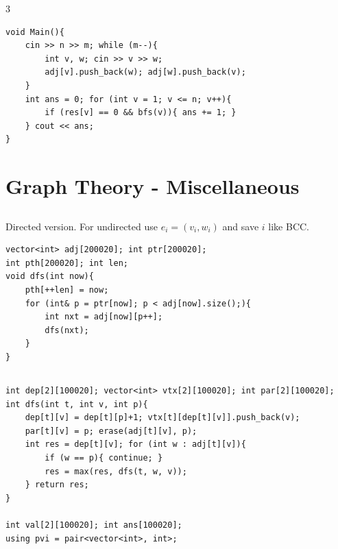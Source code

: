 \documentclass[landscape, 8pt, a4paper, oneside]{extarticle}
\begin{document}
\begin{multicols*}{3}
\begin{verbatim}
void Main(){
	cin >> n >> m; while (m--){
		int v, w; cin >> v >> w;
		adj[v].push_back(w); adj[w].push_back(v);
	}
	int ans = 0; for (int v = 1; v <= n; v++){
		if (res[v] == 0 && bfs(v)){ ans += 1; }
	} cout << ans;
}
\end{verbatim}
\section{Graph Theory - Miscellaneous}
\subsection{}
Directed version. For undirected use $e_i = (v_i, w_i)$ and save $i$ like BCC.
\begin{verbatim}
vector<int> adj[200020]; int ptr[200020];
int pth[200020]; int len;
void dfs(int now){
	pth[++len] = now;
	for (int& p = ptr[now]; p < adj[now].size();){
		int nxt = adj[now][p++];
		dfs(nxt);
	}
}
\end{verbatim}
\subsection{}
\begin{verbatim}
int dep[2][100020]; vector<int> vtx[2][100020]; int par[2][100020];
int dfs(int t, int v, int p){
	dep[t][v] = dep[t][p]+1; vtx[t][dep[t][v]].push_back(v);
	par[t][v] = p; erase(adj[t][v], p);
	int res = dep[t][v]; for (int w : adj[t][v]){
		if (w == p){ continue; }
		res = max(res, dfs(t, w, v));
	} return res;
}

int val[2][100020]; int ans[100020];
using pvi = pair<vector<int>, int>;


\end{verbatim}
\end{multicols*}
\end{document}
